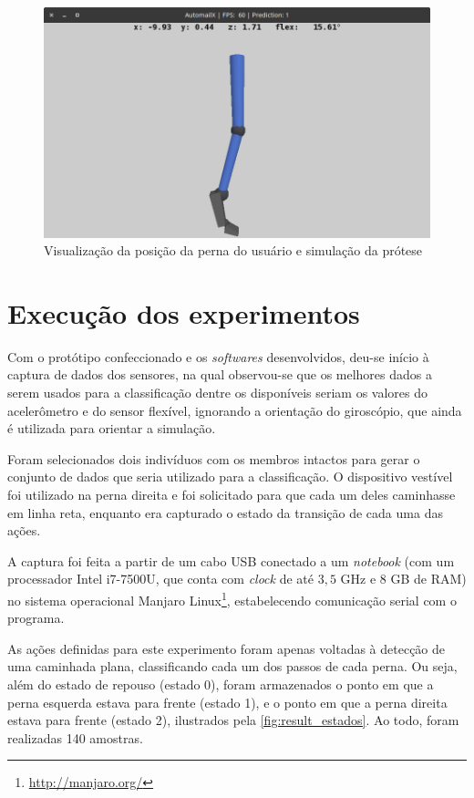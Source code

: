\begin{figure}[ht]
	\caption{\label{fig:result_simulacao}Visualização da posição da perna do usuário e simulação da prótese}
	\begin{center}
	    \includegraphics[width=.8\textwidth]{resources/result_simulacao}
	\end{center}
\end{figure}

\section{Execução dos experimentos}\label{sec:result_execucao}

Com o protótipo confeccionado e os \textit{softwares} desenvolvidos, deu-se início à captura de dados dos sensores, na qual observou-se que os melhores dados a serem usados para a classificação dentre os disponíveis seriam os valores do acelerômetro e do sensor flexível, ignorando a orientação do giroscópio, que ainda é utilizada para orientar a simulação.

Foram selecionados dois indivíduos com os membros intactos para gerar o conjunto de dados que seria utilizado para a classificação. O dispositivo vestível foi utilizado na perna direita e foi solicitado para que cada um deles caminhasse em linha reta, enquanto era capturado o estado da transição de cada uma das ações.

A captura foi feita a partir de um cabo USB conectado a um \textit{notebook} (com um processador Intel i7-7500U, que conta com \textit{clock} de até \(3{,}5\) GHz e \(8\) GB de RAM) no sistema operacional Manjaro Linux\footnote{\url{http://manjaro.org/}}, estabelecendo comunicação serial com o programa.

As ações definidas para este experimento foram apenas voltadas à detecção de uma caminhada plana, classificando cada um dos passos de cada perna. Ou seja, além do estado de repouso (estado 0), foram armazenados o ponto em que a perna esquerda estava para frente (estado 1), e o ponto em que a perna direita estava para frente (estado 2), ilustrados pela \autoref{fig:result_estados}. Ao todo, foram realizadas 140 amostras.

